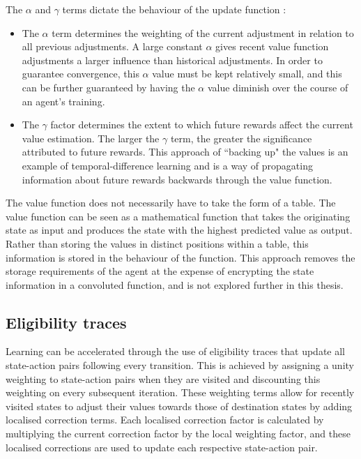 \documentclass{rucsthesis}
\begin{document}
The $\alpha$ and $\gamma$ terms dictate the behaviour of the update function :

\begin{itemize}
\item{The $\alpha$ term determines the weighting of the current adjustment in relation to all previous adjustments. A large constant $\alpha$ gives recent value function adjustments a larger influence than historical adjustments. In order to guarantee convergence, this $\alpha$ value must be kept relatively small, and this can be further guaranteed by having the $\alpha$ value diminish over the course of an agent's training.}
\item{The $\gamma$ factor determines the extent to which future rewards affect the current value estimation. The larger the $\gamma$ term, the greater the significance attributed to future rewards. This approach of ``backing up" the values is an example of temporal-difference learning \citep{suttonbarto} and is a way of propagating information about future rewards backwards through the value function.}
\end{itemize}

The value function does not necessarily have to take the form of a table. The value function can be seen as a mathematical function that takes the originating state as input and produces the state with the highest predicted value as output. Rather than storing the values in distinct positions within a table, this information is stored in the behaviour of the function. This approach removes the storage requirements of the agent at the expense of encrypting the state information in a convoluted function, and is not explored further in this thesis.

\subsection{Eligibility traces}

Learning can be accelerated through the use of eligibility traces that update all state-action pairs following every transition.  This is achieved by assigning a unity weighting to state-action pairs when they are visited and discounting this weighting on every subsequent iteration. These weighting terms allow for recently visited states to adjust their values towards those of destination states by adding localised correction terms. Each localised correction factor is calculated by multiplying the current correction factor by the local weighting factor, and these localised corrections are used to update each respective state-action pair.
\end{document}
